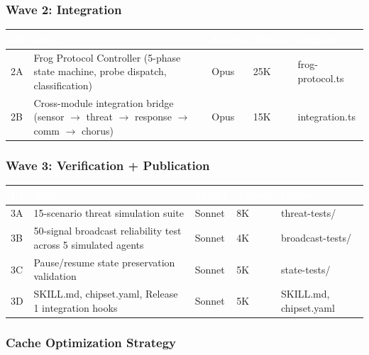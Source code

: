 \documentclass[11pt,letterpaper]{article}
\newcommand{\tableheader}[1]{\textbf{\sffamily\textcolor{white}{#1}}}
\begin{document}
\subsubsection{Wave 2: Integration}

\begin{center}
\begin{tabularx}{\textwidth}{C{0.8cm}L{3.5cm}L{1.5cm}C{1.2cm}X}
\toprule
{}
\tableheader{ID} & \tableheader{Task} & \tableheader{Model} & \tableheader{Tokens} & \tableheader{Output} \\
\midrule
2A & Frog Protocol Controller (5-phase state machine, probe dispatch, classification) & Opus & 25K & frog-protocol.ts \\
2B & Cross-module integration bridge (sensor $\to$ threat $\to$ response $\to$ comm $\to$ chorus) & Opus & 15K & integration.ts \\
\bottomrule
\end{tabularx}
\end{center}

\subsubsection{Wave 3: Verification + Publication}

\begin{center}
\begin{tabularx}{\textwidth}{C{0.8cm}L{3.5cm}L{1.5cm}C{1.2cm}X}
\toprule
{}
\tableheader{ID} & \tableheader{Task} & \tableheader{Model} & \tableheader{Tokens} & \tableheader{Output} \\
\midrule
3A & 15-scenario threat simulation suite & Sonnet & 8K & threat-tests/ \\
3B & 50-signal broadcast reliability test across 5 simulated agents & Sonnet & 4K & broadcast-tests/ \\
3C & Pause/resume state preservation validation & Sonnet & 5K & state-tests/ \\
3D & SKILL.md, chipset.yaml, Release 1 integration hooks & Sonnet & 5K & SKILL.md, chipset.yaml \\
\bottomrule
\end{tabularx}
\end{center}

\subsubsection{Cache Optimization Strategy}
\end{document}
